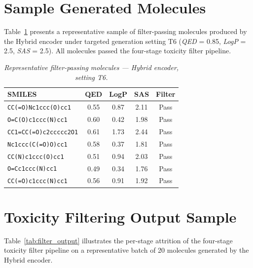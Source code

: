 \documentclass[12pt,a4paper]{report}
\begin{document}
\section{Sample Generated Molecules}

Table~\ref{tab:sample_molecules} presents a representative sample of filter-passing molecules produced by the Hybrid encoder under targeted generation setting T6 (\textit{QED} = 0.85, \textit{LogP} = 2.5, \textit{SAS} = 2.5). All molecules passed the four-stage toxicity filter pipeline.

\begin{table}[htbp]
\centering
\caption{\textit{Representative filter-passing molecules — Hybrid encoder, setting T6.}}
\label{tab:sample_molecules}
\renewcommand{\arraystretch}{1.1}
\begin{tabular}{lcccc}
\hline
\textbf{SMILES}                        & \textbf{QED} & \textbf{LogP} & \textbf{SAS} & \textbf{Filter} \\
\hline
\texttt{CC(=O)Nc1ccc(O)cc1}            & 0.55         & 0.87          & 2.11         & Pass \\
\texttt{O=C(O)c1ccc(N)cc1}             & 0.60         & 0.42          & 1.98         & Pass \\
\texttt{CC1=CC(=O)c2ccccc2O1}          & 0.61         & 1.73          & 2.44         & Pass \\
\texttt{Nc1ccc(C(=O)O)cc1}             & 0.58         & 0.37          & 1.81         & Pass \\
\texttt{CC(N)c1ccc(O)cc1}              & 0.51         & 0.94          & 2.03         & Pass \\
\texttt{O=Cc1ccc(N)cc1}                & 0.49         & 0.34          & 1.76         & Pass \\
\texttt{CC(=O)c1ccc(N)cc1}             & 0.56         & 0.91          & 1.92         & Pass \\
\hline
\end{tabular}
\end{table}

\bigskip


\section{Toxicity Filtering Output Sample}

Table~\ref{tab:filter_output} illustrates the per-stage attrition of the four-stage toxicity filter pipeline on a representative batch of 20 molecules generated by the Hybrid encoder.
\end{document}
